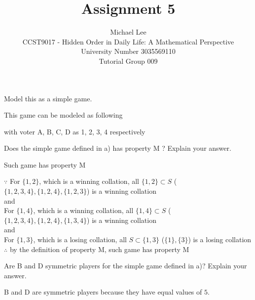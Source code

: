 \documentclass[12pt]{article}
\newenvironment{question}[2][Q]{\begin{trivlist}
    \item[\hskip \labelsep {\bfseries #1}\hskip \labelsep {\bfseries #2.}]}{\end{trivlist}}
\newenvironment{answer}[2][A]{\begin{trivlist}
    \item[\hskip \labelsep {\bfseries #1}\hskip \labelsep {\bfseries #2.}]}{\end{trivlist}}
\begin{document}



\title{Assignment 5}%
\author{Michael Lee\\ %
	CCST9017 - Hidden Order in Daily Life: A Mathematical Perspective \\
	University Number 3035569110 \\
	Tutorial Group 009
} %

\maketitle

\begin{question}{1a}
	Model this as a simple game.
\end{question}
\begin{answer}{1a}
	This game can be modeled as following
\end{answer}
\begin{equation}
	[13;10,5,2,5]
\end{equation}
with voter A, B, C, D as 1, 2, 3, 4 respectively

\begin{question}{1b}
	Does the simple game defined in a) has property M ? Explain your answer.
\end{question}
\begin{answer}{1b}
	Such game has property M
\end{answer}
$\because$ For $\{1,2\}$, which is a winning collation, all $\{1,2\}\subset S$ ($\{1,2,3,4\},\{1,2,4\},\{1,2,3\}$) is a winning collation \\
and \\
For $\{1,4\}$, which is a winning collation, all $\{1,4\}\subset S$ ($\{1,2,3,4\},\{1,2,4\},\{1,3,4\}$) is a winning collation \\
and \\
For $\{1,3\}$, which is a losing collation, all $S\subset\{1,3\}$ ($\{1\},\{3\}$) is a losing collation \\
$\therefore$ by the definition of property M, such game has property M \\

\begin{question}{1c}
	Are B and D symmetric players for the simple game defined in a)? Explain your answer.
\end{question}
\begin{answer}{1c}
	B and D are symmetric players because they have equal values of $5$.
\end{answer}
\end{document}
